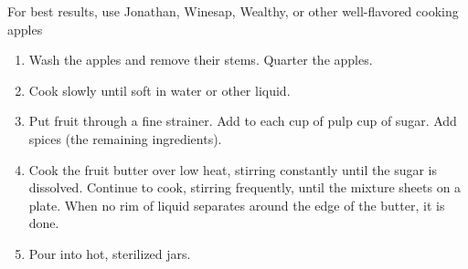 
For best results, use Jonathan, Winesap, Wealthy, or other
well-flavored cooking apples

\begin{ingredients}
\end{ingredients}


\begin{recipe}
  \begin{enumerate}

  \item Wash the apples and remove their stems.  Quarter the apples.

  \item Cook slowly until soft in water or other liquid.

  \item Put fruit through a fine strainer.  Add to each cup of pulp
    \fracH cup of sugar.  Add spices (the remaining ingredients).

  \item Cook the fruit butter over low heat, stirring constantly until
    the sugar is dissolved.  Continue to cook, stirring frequently,
    until the mixture sheets on a plate.  When no rim of liquid
    separates around the edge of the butter, it is done.

  \item Pour into hot, sterilized jars.

  \end{enumerate}
\end{recipe}

